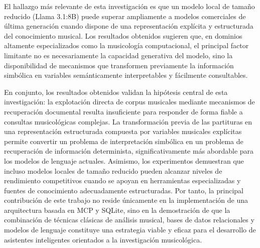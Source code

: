 
El hallazgo más relevante de esta investigación es que un modelo local de tamaño reducido (Llama 3.1:8B) puede superar ampliamente a modelos comerciales de última generación cuando dispone de una representación explícita y estructurada del conocimiento musical. Los resultados obtenidos sugieren que, en dominios altamente especializados como la musicología computacional, el principal factor limitante no es necesariamente la capacidad generativa del modelo, sino la disponibilidad de mecanismos que transformen previamente la información simbólica en variables semánticamente interpretables y fácilmente consultables.

En conjunto, los resultados obtenidos validan la hipótesis central de esta investigación: la explotación directa de corpus musicales mediante mecanismos de recuperación documental resulta insuficiente para responder de forma fiable a consultas musicológicas complejas. La transformación previa de las partituras en una representación estructurada compuesta por variables musicales explícitas permite convertir un problema de interpretación simbólica en un problema de recuperación de información determinista, significativamente más abordable para los modelos de lenguaje actuales. Asimismo, los experimentos demuestran que incluso modelos locales de tamaño reducido pueden alcanzar niveles de rendimiento competitivos cuando se apoyan en herramientas especializadas y fuentes de conocimiento adecuadamente estructuradas. Por tanto, la principal contribución de este trabajo no reside únicamente en la implementación de una arquitectura basada en MCP y SQLite, sino en la demostración de que la combinación de técnicas clásicas de análisis musical, bases de datos relacionales y modelos de lenguaje constituye una estrategia viable y eficaz para el desarrollo de asistentes inteligentes orientados a la investigación musicológica.